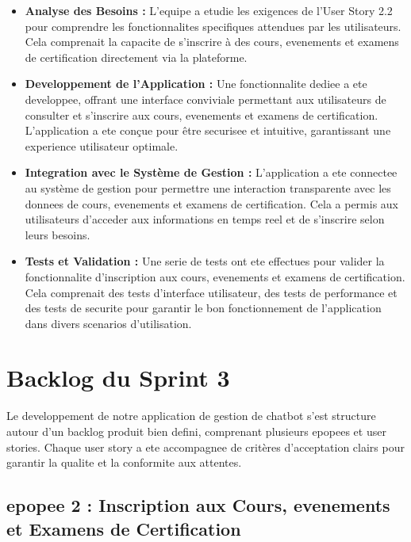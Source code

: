 \documentclass[a4paper, 11pt, openany]{report}
\begin{document}
\begin{itemize}
    \item \textbf{Analyse des Besoins :} L'equipe a etudie les exigences de l'User Story 2.2 pour comprendre les fonctionnalites specifiques attendues par les utilisateurs. Cela comprenait la capacite de s'inscrire à des cours, evenements et examens de certification directement via la plateforme.
    
    \item \textbf{Developpement de l'Application :} Une fonctionnalite dediee a ete developpee, offrant une interface conviviale permettant aux utilisateurs de consulter et s'inscrire aux cours, evenements et examens de certification. L'application a ete conçue pour être securisee et intuitive, garantissant une experience utilisateur optimale.
    
    \item \textbf{Integration avec le Système de Gestion :} L'application a ete connectee au système de gestion pour permettre une interaction transparente avec les donnees de cours, evenements et examens de certification. Cela a permis aux utilisateurs d'acceder aux informations en temps reel et de s'inscrire selon leurs besoins.
    
    \item \textbf{Tests et Validation :} Une serie de tests ont ete effectues pour valider la fonctionnalite d'inscription aux cours, evenements et examens de certification. Cela comprenait des tests d'interface utilisateur, des tests de performance et des tests de securite pour garantir le bon fonctionnement de l'application dans divers scenarios d'utilisation.
\end{itemize}

\section{Backlog du Sprint 3}

Le developpement de notre application de gestion de chatbot s’est structure autour d’un backlog produit bien defini, comprenant plusieurs epopees et user stories. Chaque user story a ete accompagnee de critères d’acceptation clairs pour garantir la qualite et la conformite aux attentes.

\subsection{epopee 2 : Inscription aux Cours, evenements et Examens de Certification}
\end{document}
